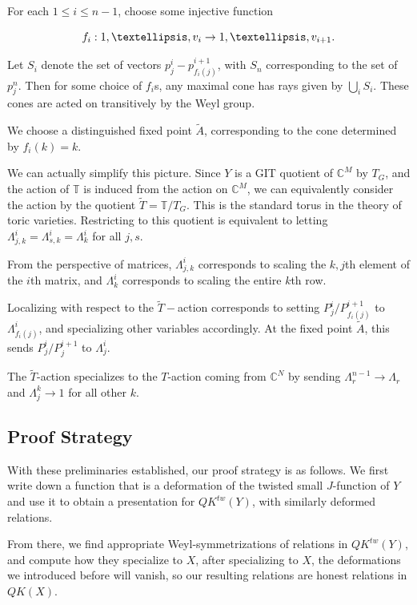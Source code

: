 \documentclass[11pt,letterpaper]{amsart}
\begin{document}
For each $1\leq i\leq n-1$, choose some injective function 

$$f_i:\\{1,\dots,v_i\\} \to \\{1,\dots,v_{i+1}\\}.$$

Let $S_i$ denote the set of vectors $p^i_j-p^{i+1}_{f_i(j)}$, with $S_{n}$ corresponding to the set of $p^n_j$. Then for some choice of $f_i$s, any maximal cone has rays given by $\bigcup_i S_i$. These cones are acted on transitively by the Weyl group. 

We choose a distinguished fixed point $\tilde{A}$, corresponding to the cone determined by $f_i(k)=k$.


We can actually simplify this picture. Since $Y$ is a GIT quotient of $\mathbb{C}^M$ by $T_G$, and the action of $\mathbb{T}$ is induced from the action on $\mathbb{C}^M$, we can equivalently consider the action by the quotient $\tilde{T}=\mathbb{T}/T_G$. This is the standard torus in the theory of toric varieties. Restricting to this quotient is equivalent to letting $\Lambda^{i}_{j,k}=\Lambda^i_{s,k}=\Lambda^{i}_{k}$ for all $j,s$. 

From the perspective of matrices, $\Lambda^{i}_{j,k}$ corresponds to scaling the $k,j$th element of the $i$th matrix, and $\Lambda^{i}_{k}$ corresponds to scaling the entire $k$th row. 

Localizing with respect to the $\tilde{T}-$action corresponds to setting $P^i_j/P^{i+1}_{f_i(j)}$ to $\Lambda^{i}_{f_i(j)}$, and specializing other variables accordingly. At the fixed point $\tilde{A}$, this sends $P^i_j/P^{i+1}_j$ to $\Lambda^i_j$. 

The $\tilde{T}$-action specializes to the $T$-action coming from $\mathbb{C}^N$ by sending $\Lambda^{n-1}_{r}\to \Lambda_r$ and $\Lambda^{k}_{j}\to 1$ for all other $k$. 



\subsection{Proof Strategy}
With these preliminaries established, our proof strategy is as follows. We first write down a function that is a deformation of the twisted small $J$-function of $Y$ and use it to obtain a presentation for $QK^{tw}(Y)$, with similarly deformed relations. 

From there, we find appropriate Weyl-symmetrizations of relations in $QK^{tw}(Y)$, and compute how they specialize to $X$, after specializing to $X$, the deformations we introduced before will vanish, so our resulting relations are honest relations in $QK(X)$.
\end{document}
